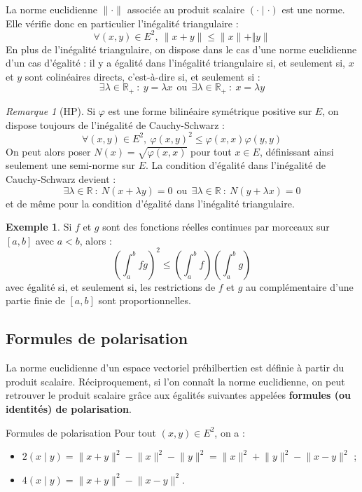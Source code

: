 \documentclass[french]{article}
\newcommand{\R}{\mathbb{R}}
\theoremstyle{plain}
\theoremstyle{definition}
\newtheorem*{ex}{Exemple}
\theoremstyle{remark}
\newtheorem*{rmq}{Remarque}
\begin{document}
\begin{thm}{}
	La norme euclidienne $\lVert\cdot\rVert$ associée au produit scalaire $(\cdot\mid\cdot)$ est une norme. Elle vérifie donc en particulier l'inégalité triangulaire : $$\forall (x,y)\in E^2,\ \lVert x+y\rVert\leqslant\lVert x\rVert+\Vert y\rVert$$ En plus de l'inégalité triangulaire, on dispose dans le cas d'une norme euclidienne d'un cas d'égalité : il y a égalité dans l'inégalité triangulaire si, et seulement si, $x$ et $y$ sont colinéaires directs, c'est-à-dire si, et seulement si : $$\exists\lambda\in\R_+\ : \ y=\lambda x\ \ \text{ou}\ \ \exists\lambda\in\R_+\ : \ x=\lambda y$$
\end{thm}

\begin{rmq}[HP]
	Si $\varphi$ est une forme bilinéaire symétrique positive sur $E$, on dispose toujours de l'inégalité de Cauchy-Schwarz : $$\forall (x,y)\in E^2,\ \varphi(x,y)^2\leqslant\varphi(x,x)\varphi(y,y)$$ On peut alors poser $N(x)=\sqrt{\varphi(x,x)}$ pour tout $x\in E$, définissant ainsi seulement une semi-norme sur $E$. La condition d'égalité dans l'inégalité de Cauchy-Schwarz devient : $$\exists\lambda\in\R\ : \ N(x+\lambda y)=0\ \ \text{ou}\ \ \exists\lambda\in\R\ : \ N(y+\lambda x)=0$$ et de même pour la condition d'égalité dans l'inégalité triangulaire.
\end{rmq}

\begin{ex}
	Si $f$ et $g$ sont des fonctions réelles continues par morceaux sur $[a,b]$ avec $a<b$, alors : $$\left(\int_{a}^{b}fg\right)^2\leqslant\left(\int_{a}^{b}f\right)\left(\int_{a}^{b}g\right)$$ avec égalité si, et seulement si, les restrictions de $f$ et $g$ au complémentaire d'une partie finie de $[a,b]$ sont proportionnelles.
\end{ex}

\subsection{Formules de polarisation}

La norme euclidienne d'un espace vectoriel préhilbertien est définie à partir du produit scalaire. Réciproquement, si l'on connaît la norme euclidienne, on peut retrouver le produit scalaire grâce aux égalités suivantes appelées \textbf{formules (ou identités) de polarisation}.

\begin{thm}{Formules de polarisation}
	Pour tout $(x,y)\in E^2$, on a :
	\begin{itemize}
		\item $2(x\mid y)=\lVert x+y\rVert^2-\lVert x\rVert^2-\lVert y\rVert^2=\lVert x\rVert^2+\lVert y\rVert^2-\lVert x-y\rVert^2$ ;
		\item $4(x\mid y)=\lVert x+y\rVert^2-\lVert x-y\rVert^2$.
	\end{itemize}
\end{thm}
\end{document}
